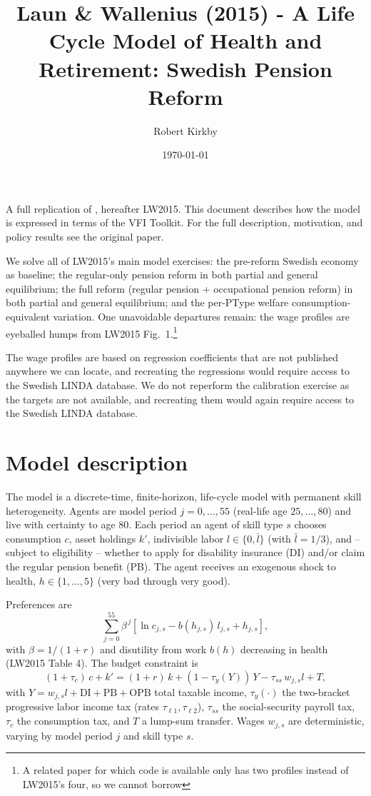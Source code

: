\documentclass[11pt,fleqn]{article}
\begin{document}
\title{Laun \& Wallenius (2015) - A Life Cycle Model of Health and Retirement: Swedish Pension Reform}
\author{Robert Kirkby}
\date{\today}
\maketitle

A full replication of \citet{LaunWallenius2015}, hereafter LW2015. This document describes how the model is expressed in terms of the VFI Toolkit. For the full description, motivation, and policy results see the original paper.

We solve all of LW2015's main model exercises: the pre-reform Swedish economy as baseline; the regular-only pension reform in both partial and general equilibrium; the full reform (regular pension + occupational pension reform) in both partial and general equilibrium; and the per-PType welfare consumption-equivalent variation. One unavoidable departures remain: the wage profiles are eyeballed humps from LW2015 Fig.\ 1.\footnote{A related paper \citet{LaunWallenius2016} for which code is available only has two profiles instead of LW2015's four, so we cannot borrow}

The wage profiles are based on regression coefficients that are not published anywhere we can locate, and recreating the regressions would require access to the Swedish LINDA database. We do not reperform the calibration exercise as the targets are not available, and recreating them would again require access to the Swedish LINDA database.


\section{Model description}
The model is a discrete-time, finite-horizon, life-cycle model with permanent skill heterogeneity. Agents are model period $j=0,\ldots,55$ (real-life age $25,\ldots,80$) and live with certainty to age $80$. Each period an agent of skill type $s$ chooses consumption $c$, asset holdings $k'$, indivisible labor $l\in\{0,\bar l\}$ (with $\bar l = 1/3$), and -- subject to eligibility -- whether to apply for disability insurance (DI) and/or claim the regular pension benefit (PB). The agent receives an exogenous shock to health, $h\in\{1,\ldots,5\}$ (very bad through very good).

Preferences are
\begin{equation*}
 \sum_{j=0}^{55} \beta^{\,j} \left[ \ln c_{j,s} - b(h_{j,s})\, l_{j,s} + h_{j,s} \right],
\end{equation*}
with $\beta=1/(1+r)$ and disutility from work $b(h)$ decreasing in health (LW2015 Table 4). The budget constraint is
\begin{equation*}
 (1+\tau_c)\, c + k' = (1+r)\, k + (1-\tau_y(Y))\, Y - \tau_{ss}\, w_{j,s} l + T,
\end{equation*}
with $Y = w_{j,s} l + \text{DI} + \text{PB} + \text{OPB}$ total taxable income, $\tau_y(\cdot)$ the two-bracket progressive labor income tax (rates $\tau_{\ell1}, \tau_{\ell2}$), $\tau_{ss}$ the social-security payroll tax, $\tau_c$ the consumption tax, and $T$ a lump-sum transfer. Wages $w_{j,s}$ are deterministic, varying by model period $j$ and skill type $s$.
\end{document}
